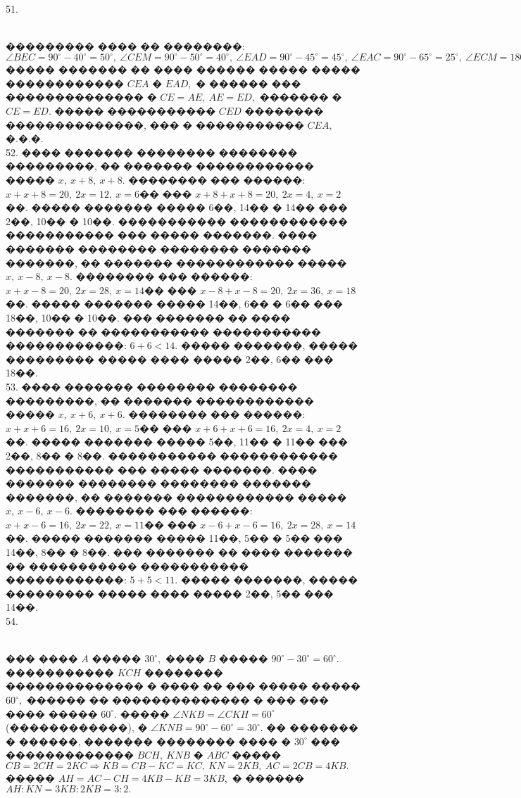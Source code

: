 \documentclass[12pt]{article}
\begin{document}
51. \begin{figure}[ht!]
\end{figure}\\
��������� ���� �� ��������: $\angle BEC=90^\circ-40^\circ=50^\circ,\ \angle CEM=90^\circ-50^\circ=40^\circ,\ \angle EAD=90^\circ-45^\circ=45^\circ,\ \angle EAC=90^\circ-65^\circ=25^\circ,\ \angle ECM=180^\circ-90^\circ-40^\circ-25^\circ=25^\circ.$ ����� ������� �� ���� ������ ����� ����� ������������ $CEA$ � $EAD,$ � ������ ��� �������������� � $CE=AE,\ AE=ED,$ ������� � $CE=ED.$ ����� ����������� $CED$ �������� ��������������, ��� � ����������� $CEA,$ �.�.�.\\
52. ���� ������� �������� �������� ���������, �� ������� ������������ ����� $x,\ x+8,\ x+8.$ �������� ��� ������: $x+x+8=20,\ 2x=12,\ x=6$�� ��� $x+8+x+8=20,\ 2x=4,\ x=2$��. ����� ������� ����� 6��, 14�� � 14�� ��� 2��, 10�� � 10��. ����������� ������������ ����������� ��� ����� �������. ���� ������� �������� �������� ������� �������, �� ������� ������������ ����� $x,\ x-8,\ x-8.$ �������� ��� ������: $x+x-8=20,\ 2x=28,\ x=14$�� ��� $x-8+x-8=20,\ 2x=36,\ x=18$��. ����� ������� ����� 14��, 6�� � 6�� ��� 18��, 10�� � 10��. ��� ������� �� ���� ������� �� ����������� ����������� ������������: $6+6<14.$ ����� �������, ����� ��������� ����� ���� ����� 2��, 6�� ��� 18��.\\
53. ���� ������� �������� �������� ���������, �� ������� ������������ ����� $x,\ x+6,\ x+6.$ �������� ��� ������: $x+x+6=16,\ 2x=10,\ x=5$�� ��� $x+6+x+6=16,\ 2x=4,\ x=2$��. ����� ������� ����� 5��, 11�� � 11�� ��� 2��, 8�� � 8��. ����������� ������������ ����������� ��� ����� �������. ���� ������� �������� �������� ������� �������, �� ������� ������������ ����� $x,\ x-6,\ x-6.$ �������� ��� ������: $x+x-6=16,\ 2x=22,\ x=11$�� ��� $x-6+x-6=16,\ 2x=28,\ x=14$��. ����� ������� ����� 11��, 5�� � 5�� ��� 14��, 8�� � 8��. ��� ������� �� ���� ������� �� ����������� ����������� ������������: $5+5<11.$ ����� �������, ����� ��������� ����� ���� ����� 2��, 5�� ��� 14��.\\
54. \begin{figure}[ht!]
\end{figure}\\
��� ���� $A$ ����� $30^\circ,$ ���� $B$ ����� $90^\circ-30^\circ=60^\circ.$ ����������� $KCH$ �������� �������������� � ���� �� ��� ����� ����� $60^\circ,$ ������ �� �������������� � ��� ��� ���� ����� $60^\circ.$ ����� $\angle NKB=\angle CKH=60^\circ$ (������������), � $\angle KNB=90^\circ-60^\circ=30^\circ.$ �� ������� � ������, ������� �������� ���� � $30^\circ$ ��� ������������� $BCH,\ KNB$ � $ABC$ ����� $CB=2CH=2KC\Rightarrow KB=CB-KC=KC,\ KN=2KB,\ AC=2CB=4KB.$ ����� $AH=AC-CH=4KB-KB=3KB,$ � ������ $AH:KN=3KB:2KB=3:2.$\\
\end{document}
